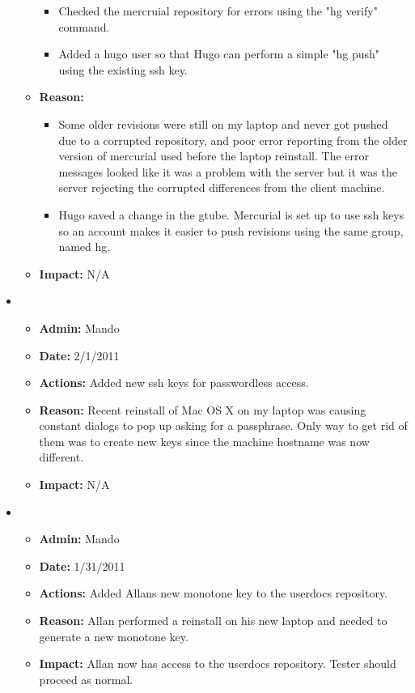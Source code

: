 \documentclass[12pt]{article}
\begin{document}
\begin{itemize}
\begin{itemize}
  \begin{itemize}
  \item[] Checked the mercruial repository for errors using the "hg verify" command. 
  \item[] Added a hugo user so that Hugo can perform a simple "hg push" using the existing ssh key.
  \end{itemize}

\item[] {\bf Reason:} 

  \begin{itemize}
  \item[] Some older revisions were still on my laptop and never got pushed due to a corrupted repository, and poor error reporting from the older version of mercurial used before the laptop reinstall. The error messages looked like it was a problem with the server but it was the server rejecting the corrupted differences from the client machine. 
  \item[] Hugo saved a change in the gtube. Mercurial is set up to use ssh keys so an account makes it easier to push revisions using the same group, named hg.
  \end{itemize}

\item[] {\bf Impact:}  N/A
\end{itemize}

\item
\begin{itemize}
\item[] {\bf Admin:} Mando
\item[] {\bf Date:} 2/1/2011 
\item[] {\bf Actions:}  Added new ssh keys for passwordless access.
\item[] {\bf Reason:} Recent reinstall of Mac OS X on my laptop was causing constant dialogs to pop up asking for a passphrase. Only way to get rid of them was to create new keys since the machine hostname was now different.
\item[] {\bf Impact:}  N/A
\end{itemize}

\item
\begin{itemize}
\item[] {\bf Admin:} Mando
\item[] {\bf Date:} 1/31/2011 
\item[] {\bf Actions:}  Added Allans new monotone key to the userdocs repository.
\item[] {\bf Reason:} Allan performed a reinstall on his new laptop and needed to generate a new monotone key.
\item[] {\bf Impact:}  Allan now has access to the userdocs repository. Tester should proceed as normal. 
\end{itemize}


\end{itemize}
\end{document}
